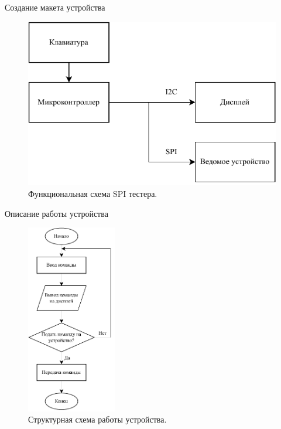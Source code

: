 \documentclass[10pt]{beamer}
\begin{document}
\begin{frame}{Создание макета устройства}
  \begin{figure}
 	 \includegraphics[width=1\textwidth]{scheme}
 	 \caption{Функциональная схема SPI тестера.}
  \end{figure}
\end{frame}

\begin{frame}{Описание работы устройства}
  \begin{figure}
 	 \includegraphics[width=0.35\textwidth]{struct}
 	 \caption{Структурная схема работы устройства.}
  \end{figure}
\end{frame}
\end{document}
